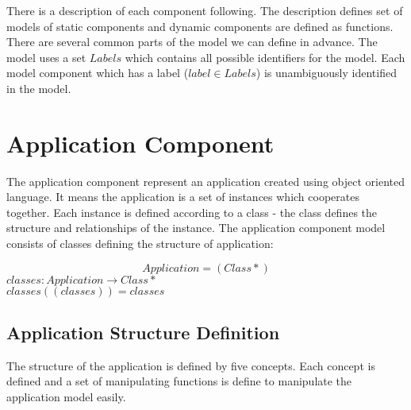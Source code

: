 \documentclass[11pt]{article}
\begin{document}
There is a description of each component following. The description defines set of models of static components and dynamic components are defined as functions. There are several common parts of the model we can define in advance. The model uses a set $Labels$ which contains all possible identifiers for the model. Each model component which has a label ($label \in Labels$) is unambiguously identified in the model.


\section{Application Component}
The application component represent an application created using object oriented language. It means the application is a set of instances which cooperates together. Each instance is defined according to a class - the class defines the structure and relationships of the instance. 
The application component model consists of  classes defining the structure of application:
 
$$
Application = (Class*)
$$
$classes : Application \rightarrow Class*$ \\
$classes((classes)) = classes$



\subsection{Application Structure Definition}
The structure of the application is defined by five concepts. Each concept is defined and a set of manipulating functions is define to manipulate the application model easily.
\end{document}
